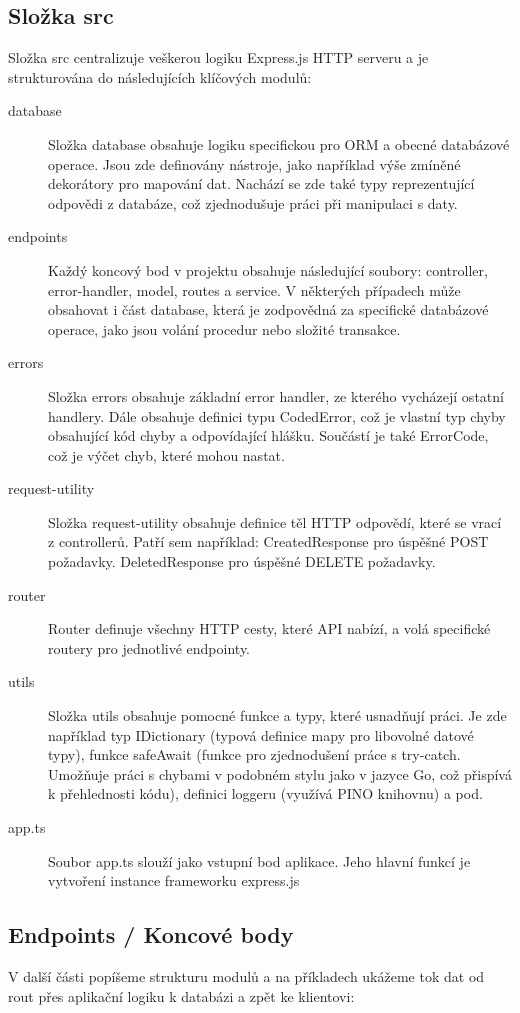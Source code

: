 \subsection{Složka src}
Složka src centralizuje veškerou logiku Express.js HTTP serveru a je strukturována do následujících klíčových modulů:
\begin{description}
    \item[database] 
    Složka database obsahuje logiku specifickou pro ORM a obecné databázové operace. Jsou zde definovány nástroje, jako například výše zmíněné dekorátory pro mapování dat. Nachází se zde také typy reprezentující odpovědi z databáze, což zjednodušuje práci při manipulaci s daty.
    \item[endpoints]
    Každý koncový bod v projektu obsahuje následující soubory: controller, error-handler, model, routes a service. V některých případech může obsahovat i část database, která je zodpovědná za specifické databázové operace, jako jsou volání procedur nebo složité transakce.
    \item[errors] 
    Složka errors obsahuje základní error handler, ze kterého vycházejí ostatní handlery. Dále obsahuje definici typu CodedError, což je vlastní typ chyby obsahující kód chyby a odpovídající hlášku. Součástí je také ErrorCode, což je výčet chyb, které mohou nastat.
    \item[request-utility] 
    Složka request-utility obsahuje definice těl HTTP odpovědí, které se vrací z controllerů. Patří sem například:
    CreatedResponse pro úspěšné POST požadavky.
    DeletedResponse pro úspěšné DELETE požadavky.
    \item[router] 
    Router definuje všechny HTTP cesty, které API nabízí, a volá specifické routery pro jednotlivé endpointy.
    \item[utils] 
    Složka utils obsahuje pomocné funkce a typy, které usnadňují práci. Je zde například typ IDictionary (typová definice mapy pro libovolné datové typy), funkce safeAwait (funkce pro zjednodušení práce s try-catch. Umožňuje práci s chybami v podobném stylu jako v jazyce Go, což přispívá k přehlednosti kódu), definici loggeru (využívá PINO knihovnu) a pod.
    \item[app.ts] 
    Soubor app.ts slouží jako vstupní bod aplikace. Jeho hlavní funkcí je vytvoření instance frameworku express.js
\end{description} 

\subsection{Endpoints / Koncové body}
V další části popíšeme strukturu modulů a na příkladech ukážeme tok dat od rout přes aplikační logiku k databázi a zpět ke klientovi:

